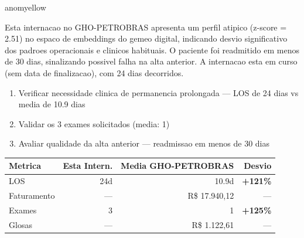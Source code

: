 \documentclass[a4paper,10pt]{article}
\begin{document}
\begin{anomalycard}[Internacao 167178 | GHO-PETROBRAS | MODERADO (z=2.51)]{anomyellow}
\vspace{2pt}\begin{tcolorbox}[colback=severityred!20,colframe=anomyellow,title={\textbf{Interpretacao de Negocio}},fonttitle=\bfseries\small,left=4pt,right=4pt,top=3pt,bottom=3pt]
{\small Esta internacao no GHO-PETROBRAS apresenta um perfil atipico (z-score = 2.51) no espaco de embeddings do gemeo digital, indicando desvio significativo dos padroes operacionais e clinicos habituais. O paciente foi readmitido em menos de 30 dias, sinalizando possivel falha na alta anterior. A internacao esta em curso (sem data de finalizacao), com 24 dias decorridos.}
\end{tcolorbox}
\begin{tcolorbox}[colback=severityyellow!30,colframe=anomorange,title={\textbf{Recomendacoes Especificas}},fonttitle=\bfseries\small,left=4pt,right=4pt,top=3pt,bottom=3pt]
\begin{enumerate}[nosep,leftmargin=16pt]
\item {\small Verificar necessidade clinica de permanencia prolongada --- LOS de 24 dias vs media de 10.9 dias}
\item {\small Validar os 3 exames solicitados (media: 1)}
\item {\small Avaliar qualidade da alta anterior --- readmissao em menos de 30 dias}
\end{enumerate}
\end{tcolorbox}
\begin{center}\begin{tabular}{l r r r}\toprule\textbf{Metrica} & \textbf{Esta Intern.} & \textbf{Media GHO-PETROBRAS} & \textbf{Desvio} \\\midrule
LOS & 24d & 10.9d & \textcolor{anomred}{\textbf{+121\%}} \\
Faturamento & --- & R\$ 17.940,12 & --- \\
Exames & 3 & 1 & \textcolor{anomred}{\textbf{+125\%}} \\
Glosas & --- & R\$ 1.122,61 & --- \\
\bottomrule\end{tabular}\end{center}


\end{anomalycard}
\end{document}
